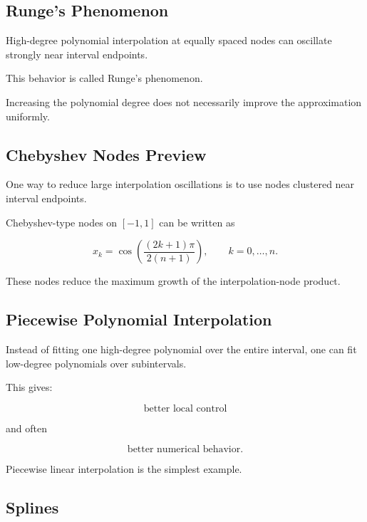 \subsection{Runge's Phenomenon}
\label{subsec:runges-phenomenon}

High-degree polynomial interpolation at equally spaced nodes can oscillate
strongly near interval endpoints.

This behavior is called Runge's phenomenon.

Increasing the polynomial degree does not necessarily improve the
approximation uniformly.

\subsection{Chebyshev Nodes Preview}
\label{subsec:chebyshev-nodes}

One way to reduce large interpolation oscillations is to use nodes clustered
near interval endpoints.

Chebyshev-type nodes on \([-1,1]\) can be written as

\[
\boxed{
x_k
=
\cos
\left(
\frac{
(2k+1)\pi
}{
2(n+1)
}
\right),
\qquad
k=0,\ldots,n.
}
\]

These nodes reduce the maximum growth of the interpolation-node product.

\subsection{Piecewise Polynomial Interpolation}
\label{subsec:piecewise-polynomial-interpolation}

Instead of fitting one high-degree polynomial over the entire interval,
one can fit low-degree polynomials over subintervals.

This gives:

\[
\boxed{
\text{better local control}
}
\]

and often

\[
\boxed{
\text{better numerical behavior}.
}
\]

Piecewise linear interpolation is the simplest example.

\subsection{Splines}
\label{subsec:numerical-splines}

